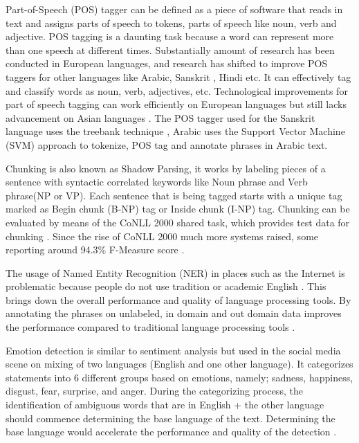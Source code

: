 Part-of-Speech (POS) tagger can be defined as a piece of software that reads in text and assigns parts of speech to tokens, parts of speech like noun,  verb and adjective. POS tagging is a daunting task because a word can represent more than one speech at different times. Substantially amount of research has been conducted in European languages, and research has shifted to improve POS taggers for other languages like Arabic, Sanskrit \cite{tapaswi2012treebank}, Hindi \cite{ranjan2003part} etc. It can effectively tag and classify words as noun, verb, adjectives, etc. Technological improvements for part of speech tagging can work efficiently on European languages but still lacks advancement on Asian languages \cite{hirschberg2015advances}. The POS tagger used for the Sanskrit language uses the treebank technique \cite{bengoetxea2010application}, Arabic uses the Support Vector Machine (SVM) \cite{diab2004automatic} approach to tokenize, POS tag and annotate phrases in Arabic text.

Chunking is also known as Shadow Parsing, it works by labeling pieces of a sentence with syntactic correlated keywords like Noun phrase and Verb phrase(NP or VP). Each sentence that is being tagged starts with a unique tag marked as Begin chunk (B-NP) tag or Inside chunk (I-NP) tag. Chunking can be evaluated by means of the CoNLL 2000 shared task, which provides test data for chunking \cite{sang2000introduction}. Since the rise of CoNLL 2000 much more systems raised, some reporting around 94.3\% F-Measure score \cite{sha2003shallow,mcdonald2005flexible,sun2008modeling}.

The usage of Named Entity Recognition (NER) in places such as the Internet is problematic because people do not use tradition or academic English \cite{nadeau2007survey}. This brings down the overall performance and quality of language processing tools. By annotating the phrases on unlabeled, in domain and out domain data improves the performance compared to traditional language processing tools \cite{katiyar-cardie-2018-nested}.

Emotion detection is similar to sentiment analysis but used in the social media scene on mixing of two languages (English and one other language). It categorizes statements into 6 different groups based on emotions, namely; sadness, happiness, disgust, fear, surprise, and anger. During the categorizing process, the identification of ambiguous words that are in English + the other language should commence determining the base language of the text. Determining the base language would accelerate the performance and quality of the detection \cite{khurana2017natural}.


